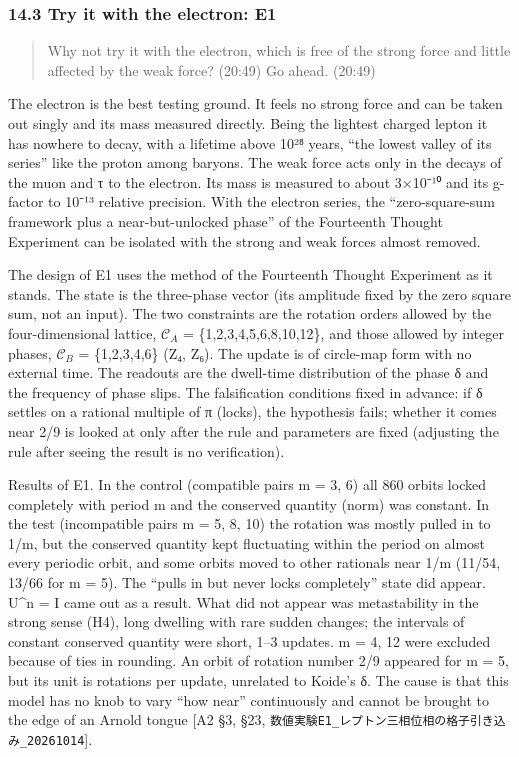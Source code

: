 \documentclass[
  a4paper,
]{article}
\begin{document}
\subsubsection{14.3 Try it with the electron:
E1}\label{try-it-with-the-electron-e1}

\begin{quote}
Why not try it with the electron, which is free of the strong force and
little affected by the weak force? (20:49) Go ahead. (20:49)
\end{quote}

The electron is the best testing ground. It feels no strong force and
can be taken out singly and its mass measured directly. Being the
lightest charged lepton it has nowhere to decay, with a lifetime above
10²⁸ years, ``the lowest valley of its series'' like the proton among
baryons. The weak force acts only in the decays of the muon and τ to the
electron. Its mass is measured to about 3×10⁻¹⁰ and its g-factor to
10⁻¹³ relative precision. With the electron series, the
``zero-square-sum framework plus a near-but-unlocked phase'' of the
Fourteenth Thought Experiment can be isolated with the strong and weak
forces almost removed.

The design of E1 uses the method of the Fourteenth Thought Experiment as
it stands. The state is the three-phase vector (its amplitude fixed by
the zero square sum, not an input). The two constraints are the rotation
orders allowed by the four-dimensional lattice, \(\mathcal{C}_A\) =
\{1,2,3,4,5,6,8,10,12\}, and those allowed by integer phases,
\(\mathcal{C}_B\) = \{1,2,3,4,6\} (Z₄, Z₆). The update is of circle-map
form with no external time. The readouts are the dwell-time distribution
of the phase δ and the frequency of phase slips. The falsification
conditions fixed in advance: if δ settles on a rational multiple of π
(locks), the hypothesis fails; whether it comes near 2/9 is looked at
only after the rule and parameters are fixed (adjusting the rule after
seeing the result is no verification).

Results of E1. In the control (compatible pairs m = 3, 6) all 860 orbits
locked completely with period m and the conserved quantity (norm) was
constant. In the test (incompatible pairs m = 5, 8, 10) the rotation was
mostly pulled in to 1/m, but the conserved quantity kept fluctuating
within the period on almost every periodic orbit, and some orbits moved
to other rationals near 1/m (11/54, 13/66 for m = 5). The ``pulls in but
never locks completely'' state did appear. U\^{}n = I came out as a
result. What did not appear was metastability in the strong sense (H4),
long dwelling with rare sudden changes; the intervals of constant
conserved quantity were short, 1--3 updates. m = 4, 12 were excluded
because of ties in rounding. An orbit of rotation number 2/9 appeared
for m = 5, but its unit is rotations per update, unrelated to Koide's δ.
The cause is that this model has no knob to vary ``how near''
continuously and cannot be brought to the edge of an Arnold tongue {[}A2
§3, §23,
\texttt{数値実験E1\_\allowbreak{}レプトン三相位相の格子引き込み\_\allowbreak{}20261014}{]}.
\end{document}
